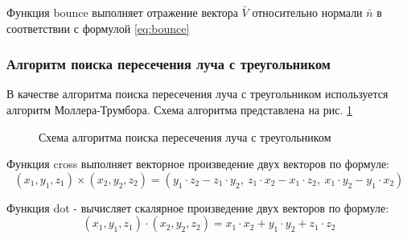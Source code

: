 \documentclass[a4paper, 14pt]{report} %
\begin{document}
	Функция bounce выполняет отражение вектора $\bar V$ относительно нормали $\bar n$ в соответствии с формулой \ref{eq:bounce}

	\subsubsection{Алгоритм поиска пересечения луча с треугольником}
	В качестве алгоритма поиска пересечения луча с треугольником используется алгоритм Моллера-Трумбора\cite{mollertrumbor}. Схема алгоритма представлена на рис. \ref{fig:triangle_intersec}
	\begin{figure}[!ht]
		\caption{Схема алгоритма поиска пересечения луча с треугольником}
		\label{fig:triangle_intersec}
	\end{figure}

	Функция cross выполняет векторное произведение двух векторов по формуле:
	\begin{equation}
		(x_1, y_1, z_1)\times(x_2, y_2, z_2)=(y_1\cdot z_2-z_1\cdot y_2,~z_1\cdot x_2-x_1\cdot z_2,~x_1\cdot y_2-y_1\cdot x_2)
	\end{equation}
	
	Функция dot - вычисляет скалярное произведение двух векторов по формуле:
	\begin{equation}
		(x_1, y_1, z_1)\cdot(x_2, y_2, z_2) = x_1\cdot x_2+y_1\cdot y_2+z_1\cdot z_2
	\end{equation}
\end{document}
